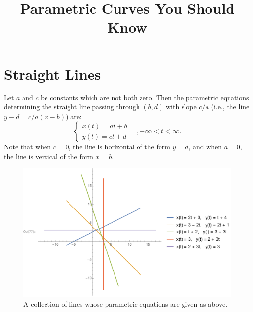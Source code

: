 \documentclass[12pt]{article}
\title{\vspace{-0.75in}\Huge{Parametric Curves You Should Know}\vspace{-0.5in}}
\date{}
\begin{document}
	\maketitle

	\section*{Straight Lines}
	Let $a$ and $c$ be constants which are not both zero. Then the parametric equations determining the straight line passing through $(b,d)$ with slope $c/a$ (i.e., the line $y-d=c/a(x-b)$) are:
	$$\left\{
		\begin{array}{l}
			x(t)=at+b\\
			y(t)=ct+d
		\end{array}\quad
	\right., -\infty < t < \infty.$$
	Note that when $c=0$, the line is horizontal of the form $y=d$, and when $a=0$, the line is vertical of the form $x=b$.
	\begin{figure}[h!]
		\begin{center}
		\includegraphics[trim={13mm 0 0 0}, clip, scale=0.625]{1_Lines}
		\caption{A collection of lines whose parametric equations are given as above.}
		\end{center}
	\end{figure}
	\vspace{-0.375in}
	
\end{document}
